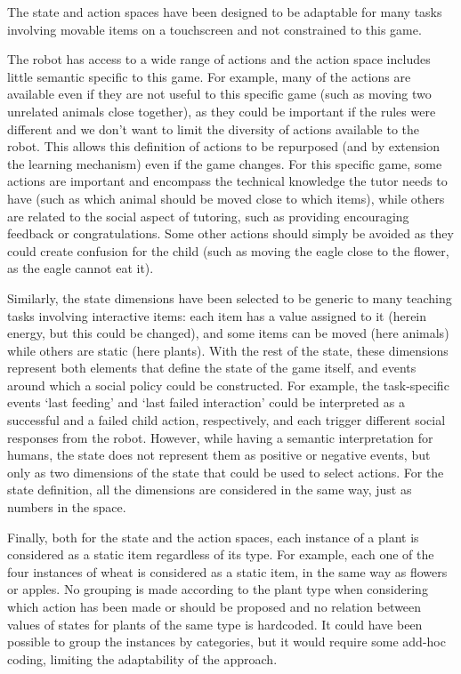 The state and action spaces have been designed to be adaptable for many tasks involving movable items on a touchscreen and not constrained to this game. 

The robot has access to a wide range of actions and the action space includes little semantic specific to this game. For example, many of the actions are available even if they are not useful to this specific game (such as moving two unrelated animals close together), as they could be important if the rules were different and we don't want to limit the diversity of actions available to the robot. This allows this definition of actions to be repurposed (and by extension the learning mechanism) even if the game changes. For this specific game, some actions are important and encompass the technical knowledge the tutor needs to have (such as which animal should be moved close to which items), while others are related to the social aspect of tutoring, such as providing encouraging feedback or congratulations. Some other actions should simply be avoided as they could create confusion for the child (such as moving the eagle close to the flower, as the eagle cannot eat it). 

Similarly, the state dimensions have been selected to be generic to many teaching tasks involving interactive items: each item has a value assigned to it (herein energy, but this could be changed), and some items can be moved (here animals) while others are static (here plants). With the rest of the state, these dimensions represent both elements that define the state of the game itself, and events around which a social policy could be constructed. For example, the task-specific events `last feeding' and `last failed interaction' could be interpreted as a successful and a failed child action, respectively, and each trigger different social responses from the robot. However, while having a semantic interpretation for humans, the state does not represent them as positive or negative events, but only as two dimensions of the state that could be used to select actions. For the state definition, all the dimensions are considered in the same way, just as numbers in the space. 

Finally, both for the state and the action spaces, each instance of a plant is considered as a static item regardless of its type. For example, each one of the four instances of wheat is considered as a static item, in the same way as flowers or apples. No grouping is made according to the plant type when considering which action has been made or should be proposed and no relation between values of states for plants of the same type is hardcoded. It could have been possible to group the instances by categories, but it would require some add-hoc coding, limiting the adaptability of the approach. 

